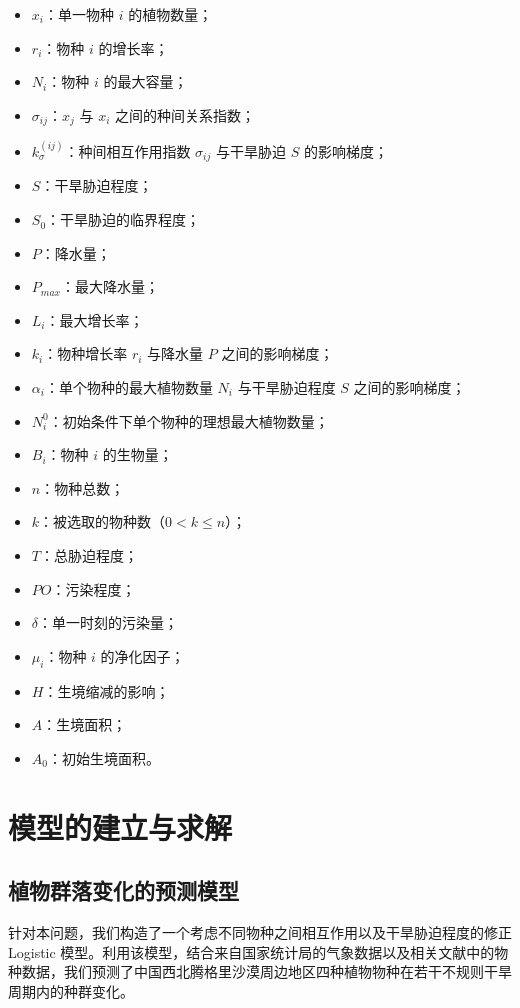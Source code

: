 \documentclass[11pt,a4paper]{ctexart}
\begin{document}
\begin{itemize}
\item $x_i$：单一物种 $i$ 的植物数量；
\item $r_i$：物种 $i$ 的增长率；
\item $N_i$：物种 $i$ 的最大容量；
\item $\sigma_{ij}$：$x_j$ 与 $x_i$ 之间的种间关系指数；
\item $k^{(ij)}_{\sigma}$：种间相互作用指数 $\sigma_{ij}$ 与干旱胁迫 $S$ 的影响梯度；
\item $S$：干旱胁迫程度；
\item $S_0$：干旱胁迫的临界程度；
\item $P$：降水量；
\item $P_{max}$：最大降水量；
\item $L_i$：最大增长率；
\item $k_i$：物种增长率 $r_i$ 与降水量 $P$ 之间的影响梯度；
\item $\alpha_i$：单个物种的最大植物数量 $N_i$ 与干旱胁迫程度 $S$ 之间的影响梯度；
\item $N_i^{0}$：初始条件下单个物种的理想最大植物数量；
\item $B_i$：物种 $i$ 的生物量；
\item $n$：物种总数；
\item $k$：被选取的物种数（$0<k\leq n$）；
\item $T$：总胁迫程度；
\item $PO$：污染程度；
\item $\delta$：单一时刻的污染量；
\item $\mu_i$：物种 $i$ 的净化因子；
\item $H$：生境缩减的影响；
\item $A$：生境面积；
\item $A_0$：初始生境面积。
\end{itemize}

\section{模型的建立与求解}

\subsection{植物群落变化的预测模型}

针对本问题，我们构造了一个考虑不同物种之间相互作用以及干旱胁迫程度的修正 Logistic 模型。利用该模型，结合来自国家统计局的气象数据以及相关文献中的物种数据，我们预测了中国西北腾格里沙漠周边地区四种植物物种在若干不规则干旱周期内的种群变化。
\end{document}
